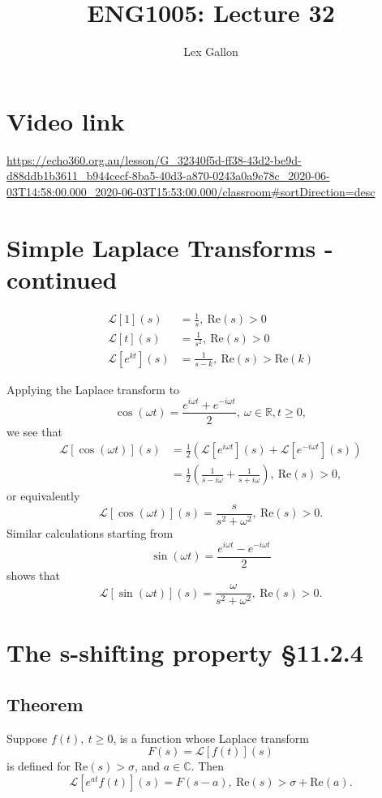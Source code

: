 \documentclass[11pt]{article}
\newcommand{\reals}{\mathbb{R}}
\newcommand{\complex}{\mathbb{C}}
\newcommand{\Laplace}{\mathscr{L}}
\begin{document}
\title{ENG1005: Lecture 32}
\author{Lex Gallon}
\maketitle

\tableofcontents

\section*{Video link}
\url{https://echo360.org.au/lesson/G_32340f5d-ff38-43d2-be9d-d88ddb1b3611_b944cecf-8ba5-40d3-a870-0243a0a9e78c_2020-06-03T14:58:00.000_2020-06-03T15:53:00.000/classroom#sortDirection=desc}

\section{Simple Laplace Transforms - continued}
\begin{align*}
\Laplace [1](s) &= \frac{1}{s},\ \text{Re}(s)>0 \\
\Laplace [t](s) &= \frac{1}{s^2},\ \text{Re}(s)>0 \\
\Laplace [e^{kt}](s) &= \frac{1}{s-k},\ \text{Re}(s)>\text{Re}(k)
\end{align*}

Applying the Laplace transform to
\[ \cos(\omega t) = \frac{e^{i \omega t} + e^{-i\omega t}}{2},\ \omega \in \reals, t \geq 0, \]
we see that
\begin{align*}
\Laplace[\cos(\omega t)](s) &= \frac{1}{2}\left( \Laplace[e^{i \omega t}](s) + \Laplace[e^{-i \omega t}](s) \right) \\
&= \frac{1}{2} \left( \frac{1}{s - i\omega} + \frac{1}{s + i\omega} \right),\ \text{Re}(s) > 0,
\end{align*}
or equivalently
\[ \Laplace[\cos(\omega t)](s) = \frac{s}{s^2 + \omega^2},\ \text{Re}(s) > 0. \]
Similar calculations starting from
\[ \sin(\omega t) = \frac{e^{i \omega t} - e^{-i\omega t}}{2} \]
shows that
\[ \Laplace[\sin(\omega t)](s) = \frac{\omega}{s^2 + \omega^2},\ \text{Re}(s) > 0. \]

\section{The s-shifting property §11.2.4}
\subsection{Theorem}
Suppose $f(t),\ t \geq 0$, is a function whose Laplace transform
\[ F(s) = \Laplace[f(t)](s) \]
is defined for $\text{Re}(s)>\sigma$, and $a \in \complex$. Then
\[ \Laplace[e^{at} f(t)](s) = F(s - a),\ \text{Re}(s) > \sigma + \text{Re}(a). \]
\end{document}

